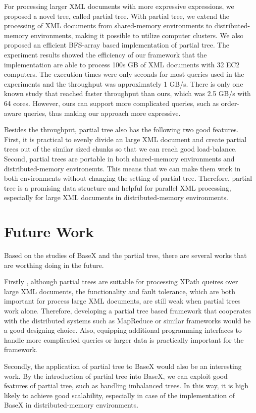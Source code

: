 For processing larger XML documents with more expressive expressions,  we
proposed a novel tree, called partial tree. With partial tree, we extend the
processing of XML documents from shared-memory environments to
distributed-memory environments, making it possible to utilize computer
clusters. We also proposed an efficient BFS-array based implementation of
partial tree. The experiment results showed the efficiency of our framework that
the implementation are able to process 100s GB of XML documents with 32 EC2
computers. The execution times were only seconds for most queries used in the
experiments and the throughput was approximately 1 GB/s. There is only one known
study that reached faster throughput than ours, which was 2.5 GB/s with 64
cores. However, ours can support more complicated queries, such as order-aware
queries, thus making our approach more expressive.

Besides the throughput, partial tree also has the following two good features.
First, it is practical to evenly divide an large XML document and create partial
trees out of the similar sized chunks so that we can reach good load-balance.
Second, partial trees are portable in both shared-memory environments and
distributed-memory environemts. This means that we can make them work in both
environments without changing the setting of partial tree. Therefore, partial
tree is a promising data structure and helpful for parallel XML processing,
especially for large XML documents in distributed-memory environments.

\section{Future Work}

Based on the studies of BaseX and the partial tree, there are several works that
are worthing doing in the future.

Firstly , although partial trees are suitable for processing XPath queires over
large XML documents, the functionality and fault tolerance, which are both
important for process large XML documents, are still weak when partial trees
work alone. Therefore, developing a partial tree based framework that cooperates
with the distributed systems such as MapReduce or similar frameworks would be a
good designing choice. Also, equipping additional programming interfaces to
handle more complicated queries or larger data is practically important for the
framework.

Secondly, the application of partial tree to BaseX would also be an interesting
work. By the introduction of partial tree into BaseX, we can exploit good
features of partial tree, such as handling imbalanced trees. In this way, it is
high likely to achieve good scalability, especially in case of the
implementation of BaseX in distributed-memory environments.


